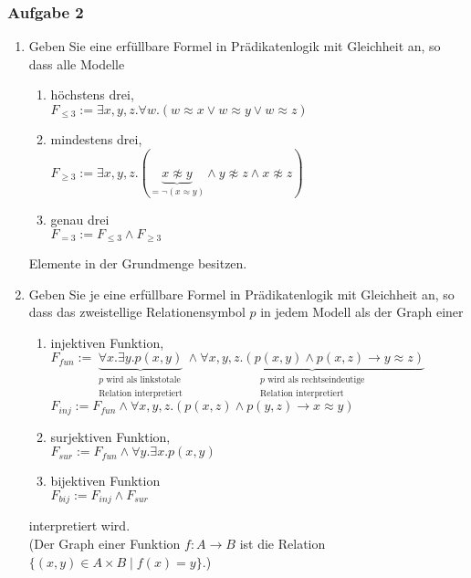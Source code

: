 \subsubsection*{Aufgabe 2}
\begin{enumerate}
\item Geben Sie eine erfüllbare Formel in Prädikatenlogik mit Gleichheit an, so dass alle Modelle 
	\begin{enumerate}[label=\roman*)]
	\item höchstens drei, \\
	\LOES $F_{\leq 3} := \exists x,y,z.\forall w.(w \approx x \lor w \approx y \lor w \approx z)$
	\item mindestens drei,\\
	\LOES $F_{\geq 3} := \exists x,y,z.(\underbrace{x \not\approx y}_{= \neg (x \approx y)} \land y \not\approx z \land x \not\approx z)$
	\item genau drei \\
	\LOES $F_{=3} := F_{\leq 3} \land F_{\geq 3}$
	\end{enumerate}
	Elemente in der Grundmenge besitzen.
\item Geben Sie je eine erfüllbare Formel in Prädikatenlogik mit Gleichheit an, so dass das zweistellige Relationensymbol $p$ in jedem Modell als der Graph einer

	\begin{enumerate}[label=\roman*)]
	\item injektiven Funktion, \\
	\LOES $F_{fun} := \underbrace{\forall x.\exists y. p(x,y)}_{\substack{{p \text{ wird als linkstotale}} \\ \text{Relation interpretiert}}} \land \underbrace{\forall x, y, z.(p(x,y) \land p(x,z) \to y \approx z)}_{\substack{{p \text{ wird als rechtseindeutige}} \\ \text{Relation interpretiert}}}$ \\
	$F_{inj} := F_{fun} \land \forall x,y,z.(p(x,z) \land p(y,z) \to x \approx y)$
	\item surjektiven Funktion, \\
	\LOES $F_{sur} := F_{fun} \land \forall y. \exists x.p(x,y)$
	\item bijektiven Funktion \\	
	\LOES $F_{bij} := F_{inj} \land F_{sur}$
	\end{enumerate}
	interpretiert wird. \\
	(Der Graph einer Funktion $f: A \to B$ ist die Relation $\{(x,y) \in A \times B \mid f(x) = y \}$.)
\end{enumerate}

